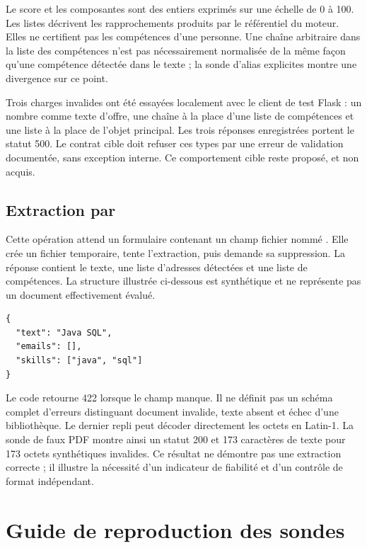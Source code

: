 Le score et les composantes sont des entiers exprimés sur une échelle de 0 à 100. Les listes décrivent les rapprochements produits par le référentiel du moteur. Elles ne certifient pas les compétences d'une personne. Une chaîne arbitraire dans la liste des compétences n'est pas nécessairement normalisée de la même façon qu'une compétence détectée dans le texte ; la sonde d'alias explicites montre une divergence sur ce point.

Trois charges invalides ont été essayées localement avec le client de test Flask : un nombre comme texte d'offre, une chaîne à la place d'une liste de compétences et une liste à la place de l'objet principal. Les trois réponses enregistrées portent le statut 500. Le contrat cible doit refuser ces types par une erreur de validation documentée, sans exception interne. Ce comportement cible reste proposé, et non acquis.

\section{Extraction par }

Cette opération attend un formulaire  contenant un champ fichier nommé . Elle crée un fichier temporaire, tente l'extraction, puis demande sa suppression. La réponse contient le texte, une liste d'adresses détectées et une liste de compétences. La structure illustrée ci-dessous est synthétique et ne représente pas un document effectivement évalué.

\begin{lstlisting}[caption={Structure illustrative d'une extraction}]
{
  "text": "Java SQL",
  "emails": [],
  "skills": ["java", "sql"]
}
\end{lstlisting}

Le code retourne 422 lorsque le champ  manque. Il ne définit pas un schéma complet d'erreurs distinguant document invalide, texte absent et échec d'une bibliothèque. Le dernier repli peut décoder directement les octets en Latin-1. La sonde de faux PDF montre ainsi un statut 200 et 173 caractères de texte pour 173 octets synthétiques invalides. Ce résultat ne démontre pas une extraction correcte ; il illustre la nécessité d'un indicateur de fiabilité et d'un contrôle de format indépendant.

\chapter{Guide de reproduction des sondes}
\label{ann:reproductibilite}

